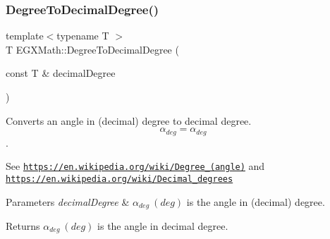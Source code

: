 \subsubsection{\texorpdfstring{Degree\+To\+Decimal\+Degree()}{DegreeToDecimalDegree()}}
{\footnotesize\ttfamily template$<$typename T $>$ \\
T E\+G\+X\+Math\+::\+Degree\+To\+Decimal\+Degree (\begin{DoxyParamCaption}\item[{const T \&}]{decimal\+Degree }\end{DoxyParamCaption})}



Converts an angle in (decimal) degree to decimal degree. \[\alpha_{deg}=\alpha_{deg}\]. 

See \href{https://en.wikipedia.org/wiki/Degree_(angle)}{\tt https\+://en.\+wikipedia.\+org/wiki/\+Degree\+\_\+(angle)} and \href{https://en.wikipedia.org/wiki/Decimal_degrees}{\tt https\+://en.\+wikipedia.\+org/wiki/\+Decimal\+\_\+degrees} 
\begin{DoxyParams}{Parameters}
{\em decimal\+Degree} & $\alpha_{deg}\ (deg)$ is the angle in (decimal) degree. \\
\hline
\end{DoxyParams}
\begin{DoxyReturn}{Returns}
$\alpha_{deg}\ (deg)$ is the angle in decimal degree. 
\end{DoxyReturn}
